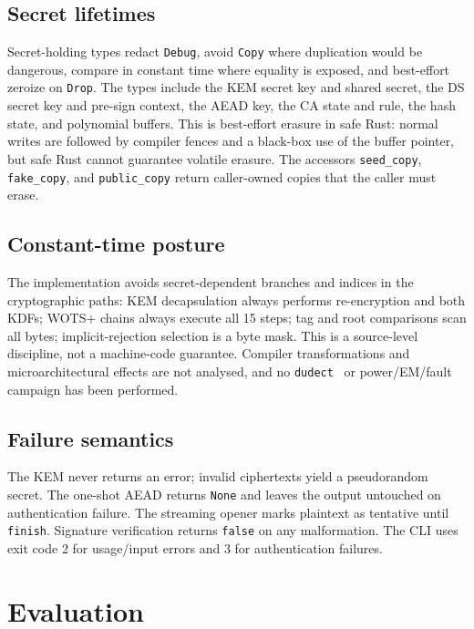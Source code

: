 \documentclass[11pt,a4paper]{article}
\theoremstyle{plain}
\theoremstyle{definition}
\theoremstyle{remark}
\begin{document}
\subsection{Secret lifetimes}

Secret-holding types redact \texttt{Debug}, avoid \texttt{Copy} where
duplication would be dangerous, compare in constant time where equality
is exposed, and best-effort zeroize on \texttt{Drop}.  The types include
the KEM secret key and shared secret, the DS secret key and pre-sign
context, the AEAD key, the CA state and rule, the hash state, and
polynomial buffers.  This is best-effort erasure in safe Rust: normal
writes are followed by compiler fences and a black-box use of the
buffer pointer, but safe Rust cannot guarantee volatile erasure.  The
accessors \texttt{seed\_copy}, \texttt{fake\_copy}, and
\texttt{public\_copy} return caller-owned copies that the caller must
erase.

\subsection{Constant-time posture}

The implementation avoids secret-dependent branches and indices in the
cryptographic paths: KEM decapsulation always performs re-encryption and
both KDFs; WOTS+ chains always execute all 15 steps; tag and root
comparisons scan all bytes; implicit-rejection selection is a byte mask.
This is a source-level discipline, not a machine-code guarantee.
Compiler transformations and microarchitectural effects are not
 analysed, and no \texttt{dudect}~\cite{dudect} or power/EM/fault
campaign has been performed.

\subsection{Failure semantics}

The KEM never returns an error; invalid ciphertexts yield a
pseudorandom secret.  The one-shot AEAD returns \texttt{None} and leaves
the output untouched on authentication failure.  The streaming opener
marks plaintext as tentative until \texttt{finish}.  Signature
verification returns \texttt{false} on any malformation.  The CLI uses
exit code 2 for usage/input errors and 3 for authentication failures.

\section{Evaluation}
\label{sec:evaluation}
\end{document}
